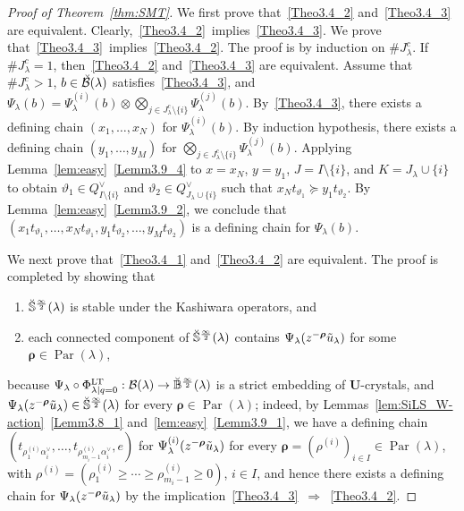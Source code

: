 \documentclass[10pt]{amsart}
\theoremstyle{definition}\newtheorem{defi}[theo]{Definition}
\theoremstyle{remark}\newtheorem{rema}[theo]{Remark}
\newcommand\bmrho[1]{\boldsymbol{#1}}
\newcommand{\U}{\mathbf{U}}
\newcommand{\si}{\frac{\infty}{2}}
\DeclareMathOperator{\LT}{LT}
\DeclareMathOperator{\Par}{Par}
\begin{document}
\begin{proof}[Proof of Theorem~\ref{thm:SMT}]
We first prove that~\ref{Theo3.4_2} and~\ref{Theo3.4_3} are equivalent. 
Clearly,~\ref{Theo3.4_2}~implies~\ref{Theo3.4_3}. 
We prove that~\ref{Theo3.4_3}~implies~\ref{Theo3.4_2}. 
The proof is by induction on 
$\# J_{\lambda}^c$. 
If 
$\# J_{\lambda}^c = 1$, 
then~\ref{Theo3.4_2} and~\ref{Theo3.4_3} are equivalent. 
Assume that 
$\# J_{\lambda}^c > 1$, 
$b \in \Breve{\mathcal{B}}(\lambda)$
satisfies~\ref{Theo3.4_3}, and 
$\Psi_{\lambda}(b) = \Psi^{(i)}_{\lambda}(b) \otimes \bigotimes_{j \in J_{\lambda}^c \setminus \{ i \}} \Psi^{(j)}_{\lambda}(b)$.
By~\ref{Theo3.4_3}, there exists a defining chain 
$(x_1 , \ldots , x_N)$
for 
$\Psi_{\lambda}^{(i)}(b)$. 
By induction hypothesis, 
there exists a defining chain 
$(y_1 , \ldots , y_M)$
for 
$\bigotimes_{j \in J_{\lambda}^c \setminus \{ i \}} \Psi_{\lambda}^{(j)}(b)$. 
Applying Lemma~\ref{lem:easy}~\ref{Lemm3.9_4} to
$x = x_N$, $y = y_1$, $J = I \setminus \{ i \}$, and $K = J_{\lambda} \cup \{ i \}$
to obtain 
$\vartheta_1 \in Q_{I \setminus \{ i \}}^{\vee}$
and 
$\vartheta_2 \in Q_{J_{\lambda} \cup \{ i \}}^{\vee}$
such that 
$x_N t_{\vartheta_1} \succeq y_1 t_{\vartheta_2}$. 
By Lemma~\ref{lem:easy}~\ref{Lemm3.9_2}, 
we conclude that 
$(x_1 t_{\vartheta_1} , \ldots , x_N t_{\vartheta_1} , y_1 t_{\vartheta_2} , \ldots , y_M t_{\vartheta_2})$
is a defining chain for 
$\Psi_{\lambda}(b)$.

We next prove that~\ref{Theo3.4_1} and~\ref{Theo3.4_2} are equivalent. 
The proof is completed by showing that 
\begin{enumerate}[label=(\roman*)]
\item\label{proof_theo3.4_i}
$\Breve{\mathbb{S}}^{\si}(\lambda)$ 
is stable under the Kashiwara operators, and 
\item\label{proof_theo3.4_ii}
each connected component of 
$\Breve{\mathbb{S}}^{\si}(\lambda)$ 
contains 
$\Psi_{\lambda}(z^{-\bmrho{\rho}} \Tilde{u}_{\lambda})$
for some 
$\bmrho{\rho} \in \Par (\lambda)$, 
\end{enumerate}
because 
$\Psi_{\lambda} \circ \Phi_{\lambda \mid q=0}^{\LT } : \mathcal{B}(\lambda) \rightarrow \Breve{\mathbb{B}}^{\si}(\lambda)$ 
is a strict embedding of $\U$-crystals, and 
$\Psi_{\lambda}(z^{-\bmrho{\rho}} \Tilde{u}_{\lambda}) \in \Breve{\mathbb{S}}^{\si}(\lambda)$
for every 
$\bmrho{\rho} \in \Par (\lambda)$; 
indeed, 
by Lemmas~\ref{lem:SiLS_W-action}~\ref{Lemm3.8_1} and~\ref{lem:easy}~\ref{Lemm3.9_1}, 
we have a defining chain
$\left( t_{\rho^{(i)}_1 \alpha_i^{\vee}} , \ldots , t_{\rho^{(i)}_{m_i-1} \alpha_i^{\vee}} , e \right)$ 
for
$\Psi_{\lambda}^{(i)}(z^{-\bmrho{\rho}} \Tilde{u}_{\lambda})$
for every 
$\bmrho{\rho} = (\rho^{(i)})_{i \in I} \in \Par (\lambda)$, 
with 
$\rho^{(i)} = (\rho^{(i)}_1 \geq \cdots \geq \rho^{(i)}_{m_i-1} \geq 0)$, 
$i \in I$, 
and hence there exists a defining chain for 
$\Psi_{\lambda}(z^{-\bmrho{\rho}} \Tilde{u}_{\lambda})$
by the implication~\ref{Theo3.4_3}~$\Rightarrow$~\ref{Theo3.4_2}.


\end{proof}
\end{document}
